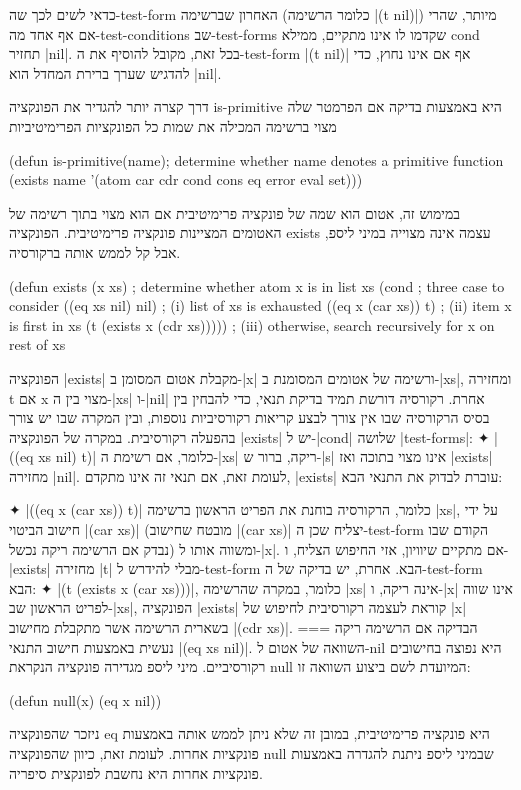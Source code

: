 כדאי לשים לכך שה-test-form האחרון שברשימה (כלומר הרשימה \T|(t nil)|) מיותר,
שהרי אם אף אחד מה-test-conditions שב-test-forms שקדמו לו אינו מתקיים, ממילא
cond תחזיר \E|nil|. בכל זאת, מקובל להוסיף את ה-test-form \T|(t nil)| אף אם אינו
נחוץ, כדי להדגיש שערך ברירת המחדל הוא \E|nil|.

דרך קצרה יותר להגדיר את הפונקציה is-primitive היא באמצעות בדיקה אם הפרמטר
שלה מצוי ברשימה המכילה את שמות כל הפונקציות הפרימיטיביות
\begin{KERNEL}
(defun is-primitive(name); determine whether name denotes a primitive function
  (exists name '(atom car cdr cond cons eq error eval set)))
\end{KERNEL}
במימוש זה, אטום הוא שמה של פונקציה פרימיטיבית אם הוא מצוי בתוך רשימה של האטומים
המציינות פונקציה פרימיטיבית. הפונקציה exists עצמה אינה מצוייה במיני ליספ, אבל
קל לממש אותה ברקורסיה.
\begin{LISP}
(defun exists (x xs) ; determine whether atom x is in list xs
  (cond ; three case to consider
    ((eq xs nil) nil) ; (i) list of xs is exhausted
    ((eq x (car xs)) t) ; (ii) item x is first in xs
    (t (exists x (cdr xs))))) ; (iii) otherwise, search recursively for x on rest of xs
\end{LISP}
הפונקציה \T|exists| מקבלת אטום המסומן ב-\T|x| ורשימה של אטומים המסומנת
ב-\T|xs|, ומחזירה t אם x מצוי בין ה-\T|xs| ו-\T|nil| אחרת. רקורסיה דורשת תמיד
בדיקת תנאי, כדי להבחין בין בסיס הרקורסיה שבו אין צורך לבצע קריאות רקורסיביות
נוספות, ובין המקרה שבו יש צורך בהפעלה רקורסיבית. במקרה של הפונקציה \T|exists|
יש ל-\T|cond| שלושה \E|test-forms|:
✦ \T|((eq xs nil) t)| כלומר, אם רשימת ה-\T|xs| ריקה, ברור ש-\T|s| אינו מצוי
בתוכה ואז \T|exists| מחזירה \T|nil|. לעומת זאת, אם תנאי זה אינו מתקדם,
\T|exists| עוברת לבדוק את התנאי הבא:

✦ \T|((eq x (car xs)) t)| כלומר, הרקורסיה בוחנת את הפריט הראשון ברשימה \T|xs|,
על ידי חישוב הביטוי \T|(car xs)| (מובטח שחישוב \T|(car xs)| יצליח שכן
ה-test-form הקודם שבו נבדק אם הרשימה ריקה נכשל) ומשווה אותו ל-\T|x|. אם מתקיים
שיוויון, אזי החיפוש הצליח, ו-\T|exists| מחזירה \T|t| מבלי להידרש ל-test-form
הבא. אחרת, יש בדיקה של ה-test-form הבא:
✦ \T|(t (exists x (car xs)))|, כלומר, במקרה שהרשימה \T|xs| אינה ריקה, ו-\T|x|
אינו שווה לפריט הראשון שב-\T|xs|, הפונקציה \T|exists| קוראת לעצמה רקורסיבית לחיפוש של
\T|x| בשארית הרשימה אשר מתקבלת מחישוב \T|(cdr xs)|.
===
הבדיקה אם הרשימה ריקה נעשית באמצעות חישוב התנאי \T|(eq xs nil)|. השוואה של
אטום ל-nil היא נפוצה בחישובים רקורסיביים. מיני ליספ מגדירה פונקציה הנקראת null
המיועדת לשם ביצוע השוואה זו:
\begin{LIBRARY}
(defun null(x) (eq x nil))
\end{LIBRARY}
ניזכר שהפונקציה eq היא פונקציה פרימיטיבית, במובן זה שלא ניתן לממש אותה באמצעות
פונקציות אחרות. לעומת זאת, כיוון שהפונקציה null שבמיני ליספ ניתנת להגדרה
באמצעות פונקציות אחרות היא נחשבת לפונקצית סיפריה.

